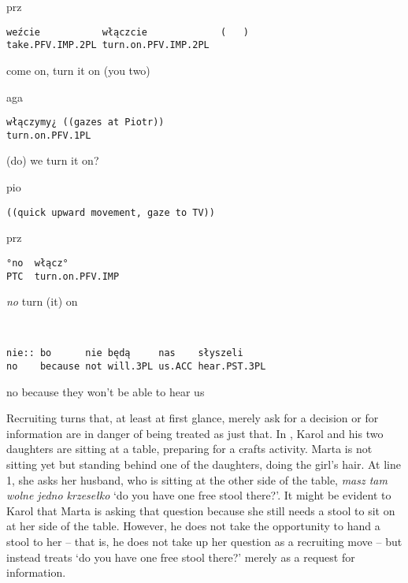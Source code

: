 \documentclass[output=paper]{langsci/langscibook}
\begin{document}
\vspace{2mm}
%
\begin{transbox}{1}{prz}
\begin{verbatim}
weźcie           włączcie             (   )
take.PFV.IMP.2PL turn.on.PFV.IMP.2PL
\end{verbatim}
 come on, turn it on (you two)
\end{transbox}
%
%
\begin{mdframednoverticalspace}[style=firstfoc]
\begin{transbox}{3}{aga}
\begin{verbatim}
włączymy¿ ((gazes at Piotr))
turn.on.PFV.1PL
\end{verbatim}
(do) we turn it on?
\end{transbox}
\end{mdframednoverticalspace}
%
\begin{mdframednoverticalspace}[style=secondfoc]
\begin{transbox}{4}{pio}
\begin{verbatim}
((quick upward movement, gaze to TV))
\end{verbatim}
\end{transbox}
\end{mdframednoverticalspace}
%
\begin{transbox}{5}{prz}
\begin{verbatim}
°no  włącz°
PTC  turn.on.PFV.IMP
\end{verbatim}
\textit{no} turn (it) on
\end{transbox}
%
\vspace{-1mm}
%
\begin{mdframednoverticalspace}[style=secondfoc]
\begin{transbox}{7}{~}
\begin{verbatim}
nie:: bo      nie będą     nas    słyszeli
no    because not will.3PL us.ACC hear.PST.3PL
\end{verbatim}
no because they won’t be able to hear us
\end{transbox}
\end{mdframednoverticalspace}\bigskip

Recruiting turns that, at least at first glance, merely ask for a decision or for information are in danger of being treated as just that.  In , Karol and his two daughters are sitting at a table, preparing for a crafts activity.  Marta is not sitting yet but standing behind one of the daughters, doing the girl’s hair.  At line 1, she asks her husband, who is sitting at the other side of the table, \textit{masz tam wolne jedno krzesełko} ‘do you have one free stool there?’.  It might be evident to Karol that Marta is asking that question because she still needs a stool to sit on at her side of the table.  However, he does not take the opportunity to hand a stool to her -- that is, he does not take up her question as a recruiting move -- but instead treats ‘do you have one free stool there?’ merely as a request for information.
\end{document}
